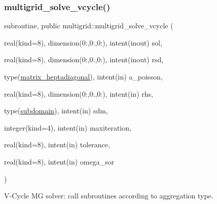 \subsubsection{\texorpdfstring{multigrid\+\_\+solve\+\_\+vcycle()}{multigrid\_solve\_vcycle()}}
{\footnotesize\ttfamily subroutine, public multigrid\+::multigrid\+\_\+solve\+\_\+vcycle (\begin{DoxyParamCaption}\item[{real(kind=8), dimension(0\+:,0\+:,0\+:), intent(inout)}]{sol,  }\item[{real(kind=8), dimension(0\+:,0\+:,0\+:), intent(inout)}]{rsd,  }\item[{type(\hyperlink{structmatrix_1_1matrix__heptadiagonal}{matrix\+\_\+heptadiagonal}), intent(in)}]{a\+\_\+poisson,  }\item[{real(kind=8), dimension(0\+:,0\+:,0\+:), intent(in)}]{rhs,  }\item[{type(\hyperlink{structgeometry_1_1subdomain}{subdomain}), intent(in)}]{sdm,  }\item[{integer(kind=4), intent(in)}]{maxiteration,  }\item[{real(kind=8), intent(in)}]{tolerance,  }\item[{real(kind=8), intent(in)}]{omega\+\_\+sor }\end{DoxyParamCaption})}



V-\/\+Cycle MG solver\+: call subroutines according to aggregation type. 


